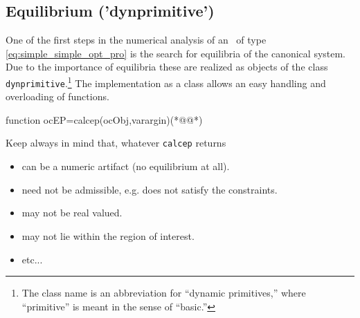 \subsection{Equilibrium ('dynprimitive')}
\label{sec:EquilibriumDynprimitivecommand}

One of the first steps in the numerical analysis of an \OCPRO\ of type \cref{eq:simple_simple_opt_pro} is the search for equilibria of the canonical system. Due to the importance of equilibria these are realized as objects of the class \lstinline+dynprimitive+.\footnote{The class name is an abbreviation for ``dynamic primitives,'' where ``primitive'' is meant in the sense of ``basic.''} The implementation as a class allows an easy handling and overloading of functions.
\begin{matlab}
function ocEP=calcep(ocObj,varargin)(*@@*)
%
%
%
%
%
%
\end{matlab}
\begin{remark}
Keep always in mind that, whatever \lstinline+calcep+ returns
\begin{itemize}
	\item can be a numeric artifact (no equilibrium at all).
	\item need not be admissible, e.g. does not satisfy the constraints.
	\item may not be real valued.
	\item may not lie within the region of interest.
	\item etc...
\end{itemize}
\end{remark}
